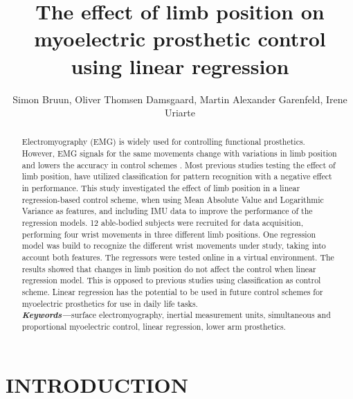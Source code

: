 \documentclass[a4paper, 10pt, conference]{ieeeconf}      %
\title{\LARGE \bf
	The effect of limb position on myoelectric prosthetic control using linear regression
}%
\author{Simon Bruun, Oliver Thomsen Damsgaard, Martin Alexander Garenfeld, Irene Uriarte}%
\begin{document}
\setcounter{topnumber}{6}
\setcounter{bottomnumber}{6}
\setcounter{totalnumber}{10}
\renewcommand{\topfraction}{1}
\renewcommand{\bottomfraction}{1}
\renewcommand{\textfraction}{0}
\renewcommand{\floatpagefraction}{1}
		
	\maketitle
	\thispagestyle{empty}
	\pagestyle{empty}
	
	
	\begin{abstract}
%		
Electromyography (EMG) is widely used for controlling functional prosthetics. However, EMG signals for the same movements change with variations in limb position and lowers the accuracy in control schemes \cite{fougner2012}. Most previous studies testing the effect of limb position, have utilized classification for pattern recognition with a negative effect in performance. This study investigated the effect of limb position in a linear regression-based control scheme, when using Mean Absolute Value and Logarithmic Variance as features, and including IMU data to improve the performance of the regression models. 12 able-bodied subjects were recruited for data acquisition, performing four wrist movements in three different limb positions. One regression model was build to recognize the different wrist movements under study, taking into account both features. The regressors were tested online in a virtual environment. The results showed that changes in limb position do not affect the control when linear regression model.
This is opposed to previous studies using classification as control scheme. Linear regression has the potential to be used in future control schemes for myoelectric prosthetics for use in daily life tasks.\\
		
\textit{\textbf{Keywords---}}surface electromyography, inertial measurement units, simultaneous and proportional myoelectric control, linear regression, lower arm prosthetics.
	\end{abstract}
	
	
\section{INTRODUCTION}%
		
\end{document}
